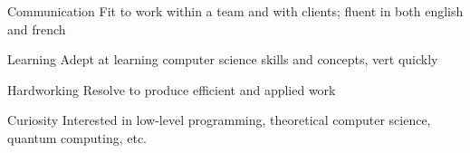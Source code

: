 

\begin{cvskills}

  \cvskill
    {Communication} %
    {Fit to work within a team and with clients; fluent in both english and french}
    
  \cvskill
    {Learning} %
    {Adept at learning computer science skills and concepts, vert quickly}
    
  \cvskill
    {Hardworking} %
    {Resolve to produce efficient and applied work}
    
  \cvskill
    {Curiosity} %
    {Interested in low-level programming, theoretical computer science, quantum computing, etc.}

\end{cvskills}
